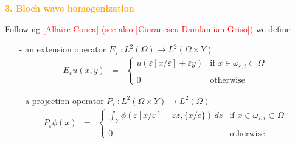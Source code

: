 \documentclass[mathserif,9pt]{beamer}
\def\e{{\varepsilon}}
\def\ds{\displaystyle}
\begin{document}
\begin{frame}
\small{

\textcolor{orange}{\Large{\bf 3. Bloch wave homogenization}}
\vspace*{1cm}

Following \textcolor{red}{[Allaire-Conca] (see also [Cioranescu-Damlamian-Griso])}
we define
\medskip

\begin{itemize}
\item[-]
an extension operator $E_\e~: L^2(\Omega) \longrightarrow L^2(\Omega \times Y)$
\textcolor{ox}{
\begin{eqnarray*}
E_\e u(x,y) &=&
\left\{ \begin{array}{cl}
u(\e [x/\e] + \e y) &\textrm{if $x \in \omega_{\e,i} \subset \Omega$}
\\
\\
0 & \textrm{otherwise}
\end{array} \right.
\end{eqnarray*}}
\medskip

\item[-]
a projection operator $P_\e~: L^2(\Omega \times Y) \longrightarrow L^2(\Omega)$
\textcolor{ox}{
\begin{eqnarray*}
P_\e \phi(x) &=&
\left\{ \begin{array}{cl}
\ds\int_Y \phi( \e [x/\e] + \e z, \{x/e\} )\, dz 
&\textrm{if $x \in \omega_{\e,i} \subset \Omega$}
\\
\\
0 & \textrm{otherwise}
\end{array} \right.
\end{eqnarray*}}
\end{itemize}


}
\end{frame}
\end{document}
